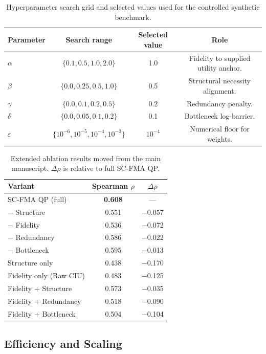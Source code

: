\documentclass[a4paper,fleqn]{cas-sc}
\begin{document}
\begin{table}[ht]
\caption{Hyperparameter search grid and selected values used for the controlled synthetic benchmark.}
\label{tab:supp-hyperparameters}
\centering
\small
\begin{tabular}{lccc}
\toprule
\textbf{Parameter} & \textbf{Search range} & \textbf{Selected value} & \textbf{Role} \\
\midrule
$\alpha$ & $\{0.1,0.5,1.0,2.0\}$ & 1.0 & Fidelity to supplied utility anchor. \\
$\beta$ & $\{0.0,0.25,0.5,1.0\}$ & 0.5 & Structural necessity alignment. \\
$\gamma$ & $\{0.0,0.1,0.2,0.5\}$ & 0.2 & Redundancy penalty. \\
$\delta$ & $\{0.0,0.05,0.1,0.2\}$ & 0.1 & Bottleneck log-barrier. \\
$\varepsilon$ & $\{10^{-6},10^{-5},10^{-4},10^{-3}\}$ & $10^{-4}$ & Numerical floor for weights. \\
\bottomrule
\end{tabular}
\end{table}

\begin{table}[ht]
\caption{Extended ablation results moved from the main manuscript. $\Delta\rho$ is relative to full SC-FMA QP.}
\label{tab:supp-ablation}
\centering
\small
\begin{tabular}{lcc}
\toprule
\textbf{Variant} & \textbf{Spearman $\rho$} & \textbf{$\Delta\rho$} \\
\midrule
SC-FMA QP (full) & \textbf{0.608} & --- \\
$-$ Structure & 0.551 & $-$0.057 \\
$-$ Fidelity & 0.536 & $-$0.072 \\
$-$ Redundancy & 0.586 & $-$0.022 \\
$-$ Bottleneck & 0.595 & $-$0.013 \\
Structure only & 0.438 & $-$0.170 \\
Fidelity only (Raw CIU) & 0.483 & $-$0.125 \\
Fidelity + Structure & 0.573 & $-$0.035 \\
Fidelity + Redundancy & 0.518 & $-$0.090 \\
Fidelity + Bottleneck & 0.504 & $-$0.104 \\
\bottomrule
\end{tabular}
\end{table}

\subsection{Efficiency and Scaling}
\label{app:efficiency-scaling}
\end{document}
